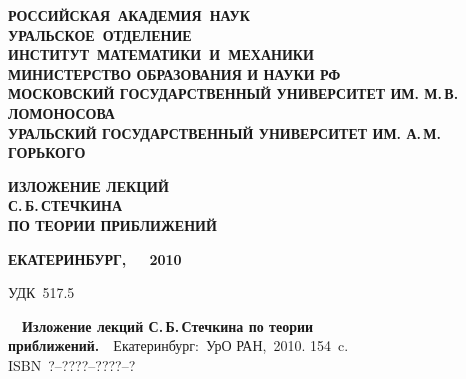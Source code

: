 \documentclass{report}
\begin{document}
\thispagestyle{empty}
\begin{center}
{\footnotesize{\textbf{РОССИЙСКАЯ\ АКАДЕМИЯ\ НАУК}}}\\
{\footnotesize{\textbf{УРАЛЬСКОЕ\ ОТДЕЛЕНИЕ}}}\\
{\footnotesize{\textbf{ИНСТИТУТ\ МАТЕМАТИКИ\ И\
МЕХАНИКИ}}}\\
{\footnotesize{\textbf{МИНИСТЕРСТВО ОБРАЗОВАНИЯ И НАУКИ РФ}}}\\
{\footnotesize{\textbf{МОСКОВСКИЙ ГОСУДАРСТВЕННЫЙ УНИВЕРСИТЕТ ИМ. М.\,В.\,ЛОМОНОСОВА}}}
\\
{\footnotesize{\textbf{УРАЛЬСКИЙ ГОСУДАРСТВЕННЫЙ УНИВЕРСИТЕТ ИМ. А.\,М.\,ГОРЬКОГО}}}
\end{center}

\vspace{3cm}

\begin{center}
{\Huge{\textbf{ИЗЛОЖЕНИЕ ЛЕКЦИЙ \\ [5pt] С.\,Б.\,СТЕЧКИНА \\ [5pt] ПО ТЕОРИИ ПРИБЛИЖЕНИЙ \\[4pt]
                }}}
\end{center}

\vfill

\begin{center}
{\footnotesize{\textbf{ЕКАТЕРИНБУРГ,\ \ }}}\ {\footnotesize{\textbf{2010}}}
\end{center}

\newpage







\newpage
\thispagestyle{empty}


\vfill


\setcounter{page}{2}




\vspace*{1.5cm}

\noindent УДК\ 517.5
\hfill

\vspace{1cm}

\noindent{}\ \
{\textbf{Изложение лекций С.\,Б.\,Стечкина по теории приближений.}}\ \
Екатеринбург:\ УрО РАН,\ 2010. 154~c.\\[12pt]
ISBN~?--????--????--?

\vspace{5mm}
\end{document}
